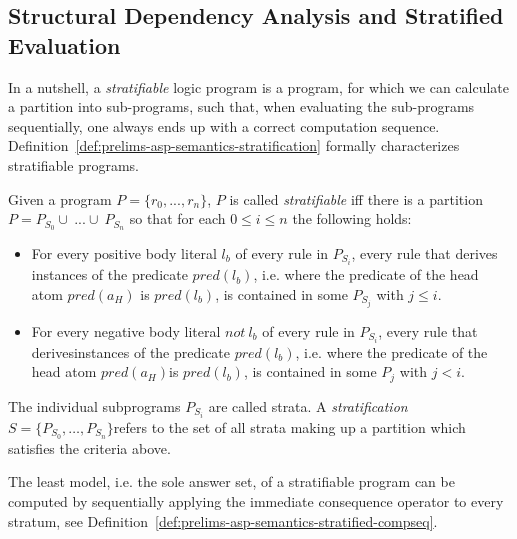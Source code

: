 \subsection{Structural Dependency Analysis and Stratified Evaluation}
\label{subsec:stratified-evaluation}

In a nutshell, a \emph{stratifiable} logic program is a program, for which we can calculate a partition into sub-programs, such that, when evaluating the sub-programs sequentially, one always ends up with a correct computation sequence. Definition~\ref{def:prelims-asp-semantics-stratification} formally characterizes stratifiable programs.

\begin{definition}
\label{def:prelims-asp-semantics-stratification}	
Given a program $P = \{r_{0}, ..., r_{n}\}$, $P$ is called \emph{stratifiable} iff there is a partition $P = P_{S_0} \cup\ ... \cup\ P_{S_n}$ so that for each $0 \le i \leq n$ the following holds:
\begin{itemize}
	\item For every positive body literal $l_{b}$ of every rule in $P_{S_i}$, every rule that derives instances of the predicate $\mathit{pred}(l_{b})$, i.e. where the predicate of the head atom $\mathit{pred}(a_H)$ is $\mathit{pred}(l_{b})$, is contained in some $P_{S_j}$ with $j \leq i$.
	\item For every negative body literal $\mathit{not}\ l_{b}$ of every rule in $P_{S_i}$, every rule that derivesinstances of the predicate $\mathit{pred}(l_{b})$, i.e. where the predicate of the head atom $\mathit{pred}(a_H)$is $\mathit{pred}(l_{b})$, is contained in some $P_{j}$ with $j < i$.
\end{itemize}
The individual subprograms $P_{S_i}$ are called strata. A \emph{stratification} $S = \{P_{S_0},\ldots, P_{S_n}\}$refers to the set of all strata making up a partition which satisfies the criteria above.
\end{definition}

The least model, i.e. the sole answer set, of a stratifiable program can be computed by sequentially applying the immediate consequence operator to every stratum, see Definition~\ref{def:prelims-asp-semantics-stratified-compseq}.

